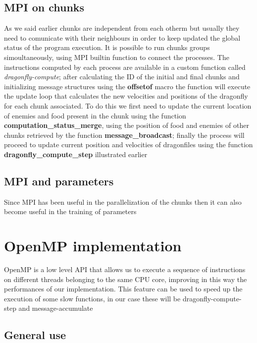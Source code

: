 \documentclass[10pt]{article}
\begin{document}
\begin{multicols}{2}
\begin{itemize}
\subsection*{MPI on chunks}
As we said earlier chunks are independent from each otherm but usually they need to comunicate
with their neighbours in order to keep updated the global status of the program execution. 
It is possible to run chunks groups simoultaneously, using MPI builtin function to connect 
the processes.  The instructions computed by each process are available in a custom function
called \textit{dragonfly-compute}; after calculating the ID of the initial and final chunks
and initializing message structures using the \textbf{offsetof} macro
the function will execute the update loop that calculates the new velocities and positions 
of the dragonfly for each chunk associated. To do this we first need to update the current
location of enemies and food present in the chunk using the function \textbf{computation\_status\_merge},
using the position of food and enemies of other chunks retrieved by the function \textbf{message\_broadcast};
finally the process will proceed to update current position and velocities of dragonfiles using 
the function \textbf{dragonfly\_compute\_step} illustrated earlier

\subsection*{MPI and parameters}
Since MPI has been useful in the parallelization of the chunks then it can also become useful in
the training of parameters

\section{OpenMP implementation}

OpenMP is a low level API that allows us to execute a sequence of instructions on different threads belonging
to the same CPU core, improving in this way the performances of our implementation. This feature can be used to 
speed up the execution of some slow functions, in our case these will be dragonfly-compute-step and message-accumulate

\subsection*{General use}


\end{itemize}
\end{multicols}
\end{document}
